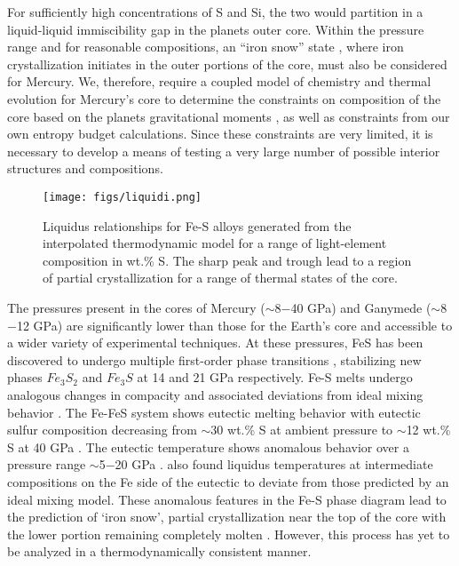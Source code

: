 For sufficiently high concentrations of S and Si, the two would partition in a
liquid-liquid immiscibility gap in the planets outer core. Within the pressure
range and for reasonable compositions, an “iron snow” state
\citep{Chen2008,Williams2009}, where iron crystallization initiates in the outer portions of
the core, must also be considered for Mercury. We, therefore, require a
coupled model of chemistry and thermal evolution for Mercury's core to determine the constraints
on composition of the core based on the planets gravitational moments
\citep{Smith2012}, as well as constraints from our own entropy budget calculations.
Since these constraints are very limited, it is necessary to develop a means of
testing a very large number of possible interior structures and compositions.

 \begin{figure}[h] %
   \centering
   \texttt{[image: figs/liquidi.png]} 
   \caption{Liquidus relationships for Fe-S alloys generated from the interpolated thermodynamic 
   model for a range of light-element composition in wt.\% S. The sharp peak and trough lead to 
   a region of partial crystallization for a range of thermal states of the core.}
   \label{fig:liquidi}
\end{figure}

The pressures present in the cores of Mercury ($\sim$8$-$40 GPa) and Ganymede
($\sim$8$-$12 GPa) are significantly lower than those for the Earth's core and
accessible to a wider variety of experimental techniques. At these pressures, 
FeS has been discovered to undergo multiple first-order phase transitions
\citep{Fei1997,Fei2000}, stabilizing new phases $Fe_3S_2$ and $Fe_3S$ at 14 and 21 GPa 
respectively. Fe-S melts undergo analogous changes in compacity
\citep{Morard2007} and associated deviations from ideal mixing behavior
\citep{Chen2008}. The Fe-FeS system shows eutectic melting behavior with eutectic
sulfur composition decreasing from $\sim$30 wt.\% S at ambient pressure to $\sim$12 
wt.\% S at 40 GPa \citep{Chudinovskikh2007}. The eutectic temperature shows
anomalous behavior over a pressure range $\sim$5$-$20 GPa \citep{Fei1997,Chen2008}.
\citet{Chen2008} also found liquidus temperatures at intermediate
compositions on the Fe side of the eutectic to deviate from those predicted by
an ideal mixing model. These anomalous features in the Fe-S phase diagram lead
to the prediction of `iron snow', partial crystallization near the top of the
core with the lower portion remaining completely molten \citep{Hauck2006,Chen2008}.
However, this process has yet to be analyzed in a thermodynamically consistent
manner.

